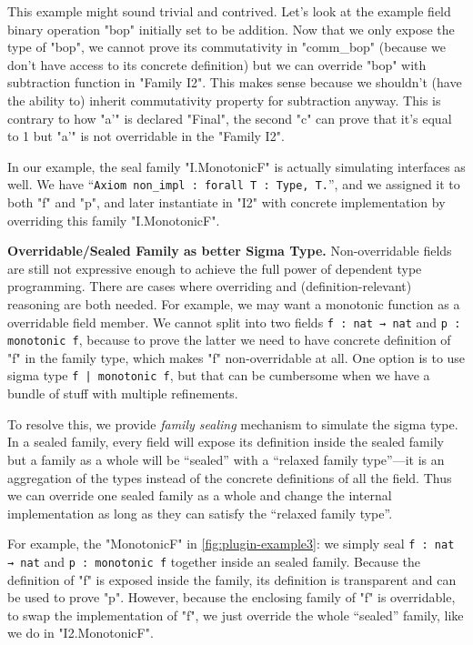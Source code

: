 This example might sound trivial and contrived. Let's look at the
example field binary operation "bop" initially set to be addition. Now that we only expose the type of "bop", we
cannot prove its commutativity in "comm_bop" (because we don't have
access to its concrete definition) but we can override "bop" with
subtraction function in "Family I2". This makes sense because we
shouldn't (have the ability to) inherit commutativity property for subtraction
anyway. This is contrary to how "a'" is declared "Final", the second "c"
can prove that it's equal to 1 but "a'" is not overridable in the
"Family I2". 

In our example, the seal family "I.MonotonicF" is actually simulating
interfaces as well.  We have
\mbox{``\texttt{Axiom non_impl : forall {T : Type}, T.}''},
and we assigned it to both "f" and "p", and later instantiate in
"I2" with concrete implementation by overriding this family
"I.MonotonicF".

\textbf{Overridable/Sealed Family as better Sigma Type.} Non-overridable fields are still not expressive enough to achieve the full power of dependent type programming. There are cases where overriding and
(definition-relevant) reasoning are both needed. For example, we may want a monotonic function as a overridable field member. We cannot split into two fields
\texttt{f : nat → nat} and \texttt{p : monotonic f},
because to prove
the latter we need to have concrete definition of "f" in the family type, which
makes "f" non-overridable at all. One option is to use sigma type
\texttt{{f | monotonic f}}, but that can be cumbersome when we have
a bundle of stuff with multiple refinements. 

To resolve this, we provide \textit{family sealing} mechanism to simulate the sigma type. In a sealed family, every field will expose its definition inside the sealed family but a family as a whole will be ``sealed'' with a ``relaxed family type''---it is an aggregation of the types instead of the concrete definitions of all the field. Thus we can override one sealed family as a whole and change the internal implementation as long as they can satisfy the ``relaxed family type''. 

For example, the "MonotonicF" in \cref{fig:plugin-example3}:
we simply seal
\texttt{f : nat → nat} and \texttt{p : monotonic f}
together inside an sealed family.
Because the definition of "f" is exposed inside the family, 
its definition is
transparent and can be used to prove "p".
However, because the enclosing family of "f" is overridable, to swap the
implementation of "f", we just override the whole ``sealed'' family,
like we do in "I2.MonotonicF". 


